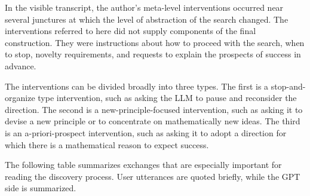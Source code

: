\documentclass[11pt]{article}
\theoremstyle{definition}
\theoremstyle{remark}
\renewcommand{\_}{\textunderscore\allowbreak}
\begin{document}
In the visible transcript, the author's meta-level interventions
occurred near several junctures at which the level of abstraction of the
search changed. The interventions referred to here did not supply
components of the final construction. They were instructions about how
to proceed with the search, when to stop, novelty requirements, and
requests to explain the prospects of success in advance.

The interventions can be divided broadly into three types. The first is
a stop-and-organize type intervention, such as asking the LLM to pause
and reconsider the direction. The second is a new-principle-focused
intervention, such as asking it to devise a new principle or to
concentrate on mathematically new ideas. The third is an
a-priori-prospect intervention, such as asking it to adopt a direction
for which there is a mathematical reason to expect success.

The following table summarizes exchanges that are especially important
for reading the discovery process. User utterances are quoted briefly,
while the GPT side is summarized.
\end{document}
